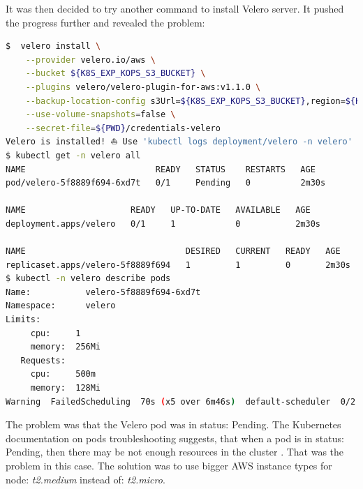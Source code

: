 It was then decided to try another command to install Velero server. It pushed the progress further and revealed the problem:
\begin{lstlisting}[basicstyle=\tiny,caption={Another attempt to deploy Velero server},captionpos=b,language=Bash,xleftmargin=1cm]
$  velero install \
    --provider velero.io/aws \
    --bucket ${K8S_EXP_KOPS_S3_BUCKET} \
    --plugins velero/velero-plugin-for-aws:v1.1.0 \
    --backup-location-config s3Url=${K8S_EXP_KOPS_S3_BUCKET},region=${K8S_EXP_REGION} \
    --use-volume-snapshots=false \
    --secret-file=${PWD}/credentials-velero
Velero is installed! ⛵ Use 'kubectl logs deployment/velero -n velero' to view the status.
$ kubectl get -n velero all
NAME                          READY   STATUS    RESTARTS   AGE
pod/velero-5f8889f694-6xd7t   0/1     Pending   0          2m30s

NAME                     READY   UP-TO-DATE   AVAILABLE   AGE
deployment.apps/velero   0/1     1            0           2m30s

NAME                                DESIRED   CURRENT   READY   AGE
replicaset.apps/velero-5f8889f694   1         1         0       2m30s
$ kubectl -n velero describe pods
Name:           velero-5f8889f694-6xd7t
Namespace:      velero
Limits:
     cpu:     1
     memory:  256Mi
   Requests:
     cpu:     500m
     memory:  128Mi
Warning  FailedScheduling  70s (x5 over 6m46s)  default-scheduler  0/2 nodes are available: 2 Insufficient cpu.
\end{lstlisting}

The problem was that the Velero pod was in status: Pending. The Kubernetes documentation on pods troubleshooting suggests, that when a pod is in status: Pending, then there may be not enough resources in the cluster \cite{k8s-deb}. That was the problem in this case. The solution was to use bigger AWS instance types for node: \textit{t2.medium} instead of: \textit{t2.micro}.

